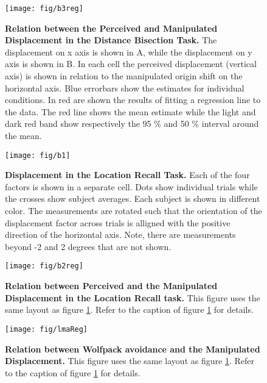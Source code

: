 \documentclass[10pt]{article}
\begin{document}
\begin{figure}[!ht]
\begin{center}
\texttt{[image: fig/b3reg]}
\end{center}
\caption{
{\bf Relation between the Perceived and Manipulated Displacement in the Distance Bisection Task.} The displacement on x axis is shown in A, while the displacement on y axis is shown in B. In each cell the perceived displacement (vertical axis) is shown in relation to the manipulated origin shift on the horizontal axis.  
Blue errorbars show the estimates for individual conditions. In red are shown the results of fitting a regression line to the data. The red line shows the mean estimate while the light and dark red band show respectively the 95 \% and 50 \% interval around the mean. }
\label{fig:b3reg}
\end{figure}

\begin{figure}[!ht]
\begin{center}
\texttt{[image: fig/b1]}
\end{center}
\caption{
{\bf Displacement in the Location Recall Task.}
Each of the four factors is shown in a separate cell. Dots show individual trials while the crosses show subject averages. Each subject is shown in different color. The measurements are rotated such that the orientation of the displacement factor across trials is alligned with the positive direction of the horizontal axis. Note, there are measurements beyond -2 and 2 degrees that are not shown.
}\label{fig:b1}
\end{figure}

\begin{figure}[!ht]
\begin{center}
\texttt{[image: fig/b2reg]}
\end{center}
\caption{
{\bf Relation between Perceived and the Manipulated Displacement in the Location Recall task.}
This figure uses the same layout as figure \ref{fig:b3reg}. Refer to the caption of figure \ref{fig:b3reg} for details.
}\label{fig:b2reg}
\end{figure}

\begin{figure}[!ht]
\begin{center}
\texttt{[image: fig/lmaReg]}
\end{center}
\caption{
{\bf Relation between Wolfpack avoidance and the Manipulated Displacement.}
This figure uses the same layout as figure \ref{fig:b3reg}. Refer to the caption of figure \ref{fig:b3reg} for details.
}\label{fig:lmaReg}
\end{figure}
\end{document}

